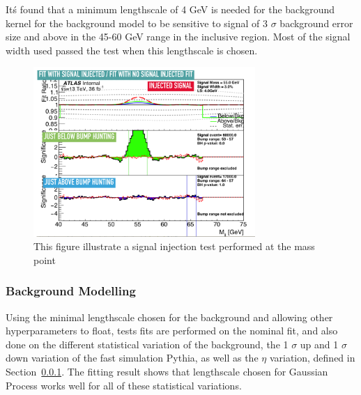 It\'s found that a minimum lengthscale of 4 GeV is needed for the background kernel for the background model to be sensitive to signal of 3 $\sigma$ background error size and above in the 45-60 GeV range in the inclusive region. Most of the signal width used passed the test when this lengthscale is chosen. 

\begin{figure}[!htb]
    \begin{center}
        \includegraphics[width=0.75\textwidth]{figures/chapter_dimuon/signalInjection}        
        \caption{
        This figure illustrate a signal injection test performed at the mass point  }
            \label{fig:dimuonstudies}
    \end{center}
\end{figure}

\subsubsection{Background Modelling}
Using the minimal lengthscale chosen for the background and allowing other hyperparameters to float, tests fits are performed on the nominal fit, and also done on the different statistical variation of the background, the 1 $\sigma$ up and 1 $\sigma$ down variation of the fast simulation Pythia, as well as the $\eta$ variation, defined in Section~\ref{}.
The fitting result shows that lengthscale chosen for Gaussian Process works well for all of these statistical variations. 

